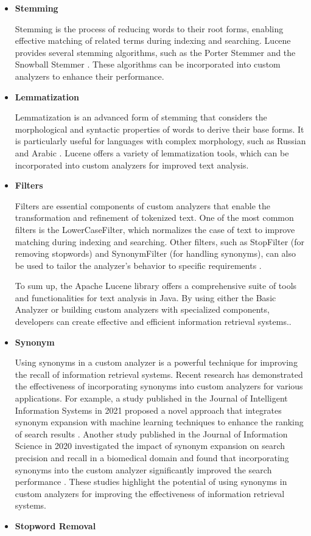 \begin{itemize}
    \item \textbf{Stemming}

    Stemming is the process of reducing words to their root forms, enabling effective matching of related terms during indexing and searching. Lucene provides several stemming algorithms, such as the Porter Stemmer \cite{porter2021porter} and the Snowball Stemmer \cite{zhang2020comparative}. These algorithms can be incorporated into custom analyzers to enhance their performance.
    \item \textbf{Lemmatization}

    Lemmatization is an advanced form of stemming that considers the morphological and syntactic properties of words to derive their base forms. It is particularly useful for languages with complex morphology, such as Russian and Arabic \cite{kutuzov2021improving}. Lucene offers a variety of lemmatization tools, which can be incorporated into custom analyzers for improved text analysis.
    \item \textbf{Filters}

    Filters are essential components of custom analyzers that enable the transformation and refinement of tokenized text. One of the most common filters is the LowerCaseFilter, which normalizes the case of text to improve matching during indexing and searching. Other filters, such as StopFilter (for removing stopwords) and SynonymFilter (for handling synonyms), can also be used to tailor the analyzer's behavior to specific requirements \cite{gospodnetic2021lucene}.

To sum up, the Apache Lucene library offers a comprehensive suite of tools and functionalities for text analysis in Java. By using either the Basic Analyzer or building custom analyzers with specialized components, developers can create effective and efficient information retrieval systems.\cite{robertson1996okapi}.
    \item \textbf{Synonym}

    Using synonyms in a custom analyzer is a powerful technique for improving the recall of information retrieval systems. Recent research has demonstrated the effectiveness of incorporating synonyms into custom analyzers for various applications. For example, a study published in the Journal of Intelligent Information Systems in 2021 proposed a novel approach that integrates synonym expansion with machine learning techniques to enhance the ranking of search results \cite{li2021effective}. Another study published in the Journal of Information Science in 2020 investigated the impact of synonym expansion on search precision and recall in a biomedical domain and found that incorporating synonyms into the custom analyzer significantly improved the search performance \cite{tabassum2020impact}. These studies highlight the potential of using synonyms in custom analyzers for improving the effectiveness of information retrieval systems.
    \item \textbf{Stopword Removal}


\end{itemize}

